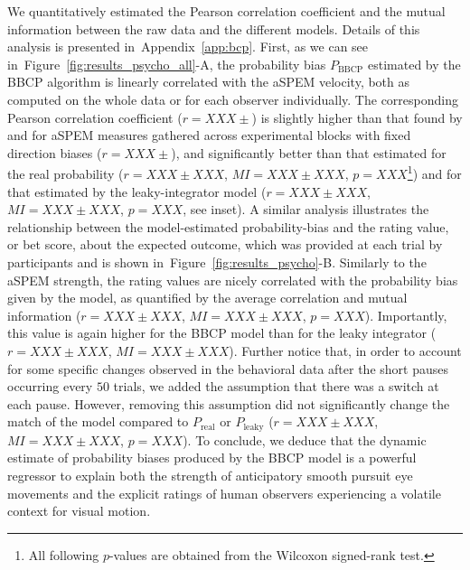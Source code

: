 \documentclass[12pt,english]{article}%
\newcommand{\Cc}{\mathcal{C}}
\newcommand{\citet}[1]{\textcite{#1}}
\newcommand{\seeFig}[1]{Figure~\ref{fig:#1}}
\newcommand{\seeEq}[1]{Equation~\ref{eq:#1}}
\newcommand{\seeApp}[1]{Appendix~\ref{app:#1}}
\begin{document}
We quantitatively estimated the Pearson correlation coefficient
and the mutual information %
between the raw data and the different models.
Details of this analysis is presented in~\seeApp{bcp}.
First, as we can see in~\seeFig{results_psycho_all}-A,
the probability bias $P_{\text{BBCP}}$ estimated by the BBCP algorithm
is linearly correlated with the aSPEM velocity, both as computed on the whole data or 
for each observer individually.
The corresponding Pearson correlation coefficient ($r = XXX \pm $)
is slightly higher than that found by
\citet{Montagnini2010} and \citet{Damasse18} for aSPEM measures gathered across experimental blocks with fixed direction biases ($r = XXX \pm $),
and significantly better than that estimated 
for the real probability ($r = XXX \pm XXX$, $MI = XXX \pm XXX$, $p=XXX$\footnote{All following $p$-values are obtained from the Wilcoxon signed-rank test.}) %
and for that estimated by the leaky-integrator model ($r = XXX \pm XXX$, $MI = XXX \pm XXX$, $p=XXX$, see inset).
A similar analysis
illustrates the relationship between
the model-estimated probability-bias
and the rating value, or bet score, about the expected outcome, which was provided at each trial
by participants 
and is shown in~\seeFig{results_psycho}-B.
Similarly to the aSPEM strength, the rating values are nicely correlated
with the probability bias given by the model, 
as quantified by the average correlation and mutual information 
($r = XXX \pm XXX$, $MI = XXX \pm XXX$, $p=XXX$).
Importantly, this value is again higher for the BBCP model than
for the leaky integrator ($r = XXX \pm XXX$, $MI = XXX \pm XXX$).
Further notice that, in order to account for some specific changes 
observed in the behavioral data after the short pauses 
occurring every $50$ trials, 
we added the assumption %
that there was a switch at each pause. 
However, removing this assumption did not significantly change the match of the model
compared to $P_{\text{real}}$ or $P_{\text{leaky}}$ 
($r = XXX \pm XXX$, $MI = XXX \pm XXX$, $p=XXX$).
To conclude, we deduce that the dynamic estimate of probability biases produced by the BBCP model
is a powerful regressor to explain both the strength of anticipatory smooth pursuit eye movements and the explicit ratings of human observers experiencing a volatile context for visual motion.
\end{document}
